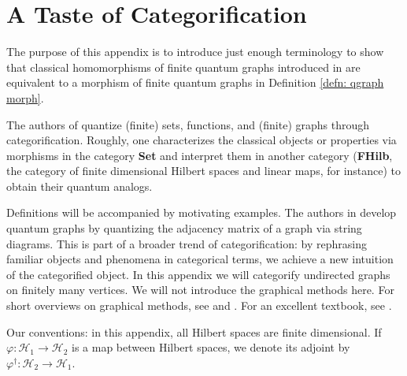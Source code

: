 \documentclass[12pt]{article}
\theoremstyle{definition}
\newcommand{\mc}[1]{\mathcal{#1}}
\newcommand{\<}{\langle}
\renewcommand{\>}{\rangle}
\begin{document}
\appendix


\section{A Taste of Categorification} \label{appendix: string}

The purpose of this appendix is to introduce just enough terminology to show that classical homomorphisms of finite quantum graphs introduced in \cite[Section 5.2]{musto-reutter-verdon} are equivalent to a morphism of finite quantum graphs in Definition \ref{defn: qgraph morph}. 

The authors of \cite{cq-metric} quantize (finite) sets, functions, and (finite) graphs through categorification. Roughly, one characterizes the classical objects or properties via morphisms in the category \textbf{Set} and interpret them in another category (\textbf{FHilb}, the category of finite dimensional Hilbert spaces and linear maps, for instance) to obtain their quantum analogs.

Definitions will be accompanied by motivating examples. The authors in \cite{musto-reutter-verdon} develop quantum graphs by quantizing the adjacency matrix of a graph via string diagrams. This is part of a broader trend of categorification: by rephrasing familiar objects and phenomena in categorical terms, we achieve a new intuition of the categorified object. In this appendix we will categorify undirected graphs on finitely many vertices. We will not introduce the graphical methods here. For short overviews on graphical methods, see \cite{musto-reutter-verdon} and \cite[Chapter 4]{adina}. For an excellent textbook, see \cite{heunen-vicary}.

Our conventions: in this appendix, all Hilbert spaces are finite dimensional. If $\varphi: \mc H_1 \to \mc H_2$ is a map between Hilbert spaces, we denote its adjoint by $\varphi^\dagger: \mc H_2 \to \mc H_1$. 
\end{document}
